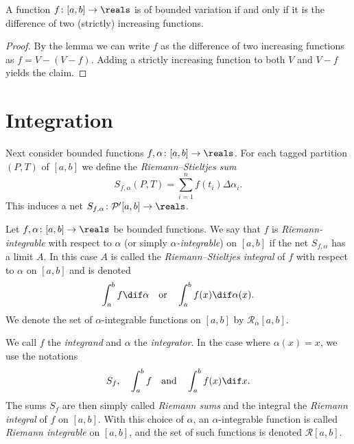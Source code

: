 \documentclass[article, a4paper, 11pt, oneside]{memoir}
\numberwithin{equation}{chapter}
\newcommand{\calP}{\mathcal{P}}
\newcommand{\calR}{\mathcal{R}}
\begin{document}
\begin{proposition}
    A function $f \colon [a,b] \to \reals$ is of bounded variation if and only if it is the difference of two (strictly) increasing functions.
\end{proposition}

\begin{proof}
    By the lemma we can write $f$ as the difference of two increasing functions as $f = V - (V - f)$. Adding a strictly increasing function to both $V$ and $V - f$ yields the claim.
\end{proof}


\section{Integration}

Next consider bounded functions $f, \alpha \colon [a,b] \to \reals$. For each tagged partition $(P,T)$ of $[a,b]$ we define the \emph{Riemann--Stieltjes sum}
%
\begin{equation*}
    S_{f,\alpha}(P,T)
        = \sum_{i=1}^n f(t_i) \Delta\alpha_i.
\end{equation*}
%
This induces a net $S_{f,\alpha} \colon \calP'[a,b] \to \reals$.


\begin{definition}
    Let $f,\alpha \colon [a,b] \to \reals$ be bounded functions. We say that $f$ is \emph{Riemann-integrable} with respect to $\alpha$ (or simply \emph{$\alpha$-integrable}) on $[a,b]$ if the net $S_{f,\alpha}$ has a limit $A$. In this case $A$ is called the \emph{Riemann--Stieltjes integral} of $f$ with respect to $\alpha$ on $[a,b]$ and is denoted
    \begin{equation*}
        \int_a^b f \dif \alpha
        \quad \text{or} \quad
        \int_a^b f(x) \dif \alpha(x).
    \end{equation*}
    We denote the set of $\alpha$-integrable functions on $[a,b]$ by $\calR_\alpha[a,b]$.
\end{definition}
%
We call $f$ the \emph{integrand} and $\alpha$ the \emph{integrator}. In the case where $\alpha(x) = x$, we use the notations
%
\begin{equation*}
    S_f,
    \quad
    \int_a^b f
    \quad \text{and} \quad
    \int_a^b f(x) \dif x.
\end{equation*}
%
The sums $S_f$ are then simply called \emph{Riemann sums} and the integral the \emph{Riemann integral} of $f$ on $[a,b]$. With this choice of $\alpha$, an $\alpha$-integrable function is called \emph{Riemann integrable} on $[a,b]$, and the set of such functions is denoted $\calR[a,b]$.
\end{document}
